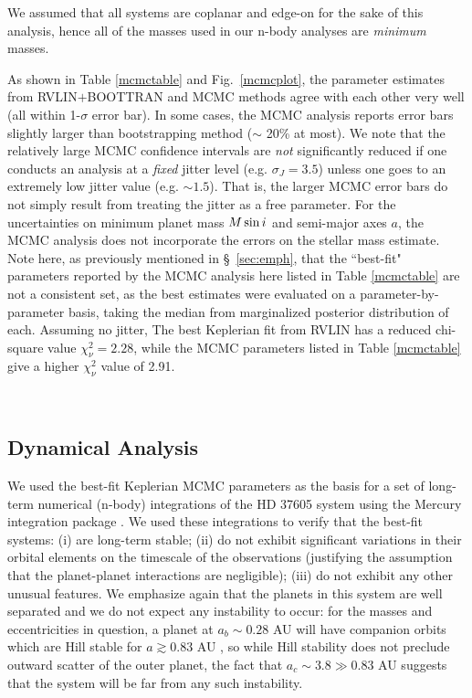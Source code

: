 We assumed that all systems are coplanar and edge-on for the sake of
this analysis, hence all of the masses used in our n-body analyses are
\emph{minimum} masses. 

As shown in Table \ref{mcmctable} and Fig.~\ref{mcmcplot}, the
parameter estimates from RVLIN$+$BOOTTRAN and MCMC methods agree with
each other very well (all within 1-$\sigma$ error bar). In some cases,
the MCMC analysis reports error bars slightly larger than
bootstrapping method ($\sim$ 20\% at most). We note that the
relatively large MCMC confidence intervals are \emph{not}
significantly reduced if one conducts an analysis at a \emph{fixed}
jitter level (e.g. $\sigma_J = 3.5$\mps) unless one goes to an
extremely low jitter value (e.g. $\sim 1.5$\mps). That is, the larger
MCMC error bars do not simply result from treating the jitter as a
free parameter.
%
For the uncertainties on minimum planet mass $M\sin{i}$ and semi-major
axes $a$, the MCMC analysis does not incorporate the errors on the
stellar mass estimate.
%
Note here, as previously mentioned in \S~\ref{sec:emph}, that
the ``best-fit" parameters reported by the MCMC analysis here listed
in Table \ref{mcmctable} are not a consistent set, as the best
estimates were evaluated on a parameter-by-parameter basis, taking the
median from marginalized posterior distribution of each. Assuming no
jitter, The best Keplerian fit from RVLIN has a reduced chi-square
value $\chi_{\nu}^2 = 2.28$, while the MCMC parameters listed in Table
\ref{mcmctable} give a higher $\chi_{\nu}^2$ value of 2.91.

~~
\subsection{Dynamical Analysis}\label{SECN:DYNAMICS}
%

We used the best-fit Keplerian MCMC parameters as the basis for a set
of long-term numerical (n-body) integrations of the HD 37605 system
using the Mercury integration package \citep{Chambers1999}. We used
these integrations to verify that the best-fit systems: (i) are
long-term stable; (ii) do not exhibit significant variations in their
orbital elements on the timescale of the observations (justifying the
assumption that the planet-planet interactions are negligible); (iii)
do not exhibit any other unusual features. We emphasize again that the
planets in this system are well separated and we do not expect any
instability to occur: for the masses and eccentricities in question, a
planet at $a_b \sim 0.28$ AU will have companion orbits which are
Hill stable for $a \gtrsim 0.83$ AU \citep{1993Icar..106..247G}, so while Hill
stability does not preclude outward scatter of the outer planet, the
fact that $a_c \sim 3.8 \gg 0.83$ AU suggests that the system will
be far from any such instability.

